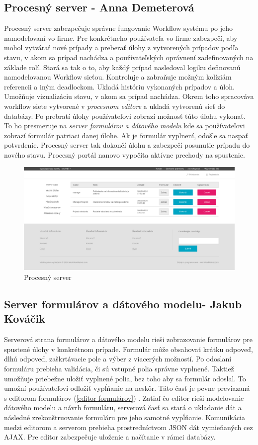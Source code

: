 \subsection{Procesný server - Anna Demeterová}
Procesný server zabezpečuje správne fungovanie Workflow systému po jeho namodelovaní vo firme. Pre konkrétneho používateľa vo firme zabezpečí, aby mohol vytvárať nové prípady a preberať úlohy z vytvorených prípadov podľa stavu, v akom sa prípad nachádza a používateľských oprávnení zadefinovaných na základe rolí. Stará sa tak o to, aby každý prípad nasledoval logiku definovanú namodelovanou Workflow sieťou. Kontroluje a zabraňuje možným  kolíziám referencii a iným deadlockom.  
Ukladá históriu vykonaných prípadov a úloh. Umožňuje vizualizáciu stavu, v akom sa prípad nachádza. Okrem toho spracováva workflow siete vytvorené v \emph{procesnom editore} a ukladá vytvorenú sieť do databázy. Po prebratí úlohy používateľovi zobrazí možnosť túto úlohu vykonať. To ho presmeruje na \emph{server formulárov a dátového modelu} kde sa používateľovi zobrazí formulár patriaci danej úlohe. Ak je formulár vyplnení, odošle sa naspať potvrdenie. Procesný server tak dokončí úlohu a zabezpečí posunutie prípadu do nového stavu. Procesný portál nanovo vypočíta aktívne prechody na spustenie.

\begin{figure}[H]
	\centering
	\includegraphics[width=0.7\linewidth]{images/anicka}
	\caption{Procesný server}
	\label{fig:Procesný server}
\end{figure}



\subsection{Server formulárov a dátového modelu- Jakub Kováčik}
Serverová strana formulárov a dátového modelu rieši zobrazovanie formulárov pre spustené úlohy v konkrétnom prípade. Formulár môže obsahovať krátku odpoveď, dlhú odpoveď, zaškrtávacie pole a výber z viacerých možností. Po odoslaní formuláru prebieha validácia, či sú vstupné polia správne vyplnené. Taktiež umožňuje priebežne uložiť vyplnené polia, bez toho aby sa formulár odoslal. To umožní používateľovi odložiť vypĺňanie na neskôr. Táto časť je pevne previazaná s editorom formulárov (\ref{editor formulárov}) . Zatiaľ čo editor rieši modelovanie dátového modelu a návrh formuláru, serverová časť sa stará o ukladanie dát a následné zrekonštruovanie formuláru pre jeho samotné vypĺňanie. Komunikácia medzi editorom a serverom prebieha prostredníctvom JSON dát vymieňaných cez AJAX. Pre editor zabezpečuje uloženie a načítanie v rámci databázy. 


